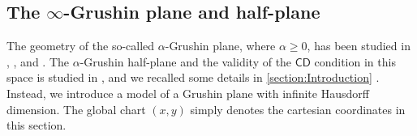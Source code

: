 \documentclass[11pt,twoside,a4paper]{article}
\newcommand{\red}{\color{red}}
\newcommand*\diff{\mathop{}\!\mathrm{d}}
\newcommand{\R}{\mathbb{R}}
\newcommand{\bbH}{\mathbb{H}}
\newcommand{\g}{\mathrm{g}}
\newcommand{\vol}{\mathrm{dvol}}
\newcommand{\cd}{\mathsf{CD}}
\newcommand{\m}{\mathfrak m} %
\theoremstyle{theorem}
\theoremstyle{definition}
\theoremstyle{remark}
\theoremstyle{proof}
\begin{document}




\subsection{The \texorpdfstring{$\infty$}{infty}-Grushin plane and half-plane}\label{section:alphaGrushin3}

The geometry of the so-called $\alpha$-Grushin plane, where $\alpha \geq 0$, has been studied in \cite{li2012}, \cite{borza2022}, and \cite{borza2023}. The $\alpha$-Grushin half-plane and the validity of the $\cd$ condition in this space is studied in \cite{rizzi2023failure}, and we recalled some details in \cref{section:Introduction} . Instead, we introduce a model of a Grushin plane with infinite Hausdorff dimension. The global chart $(x, y)$ simply denotes the cartesian coordinates in this section.
\end{document}
